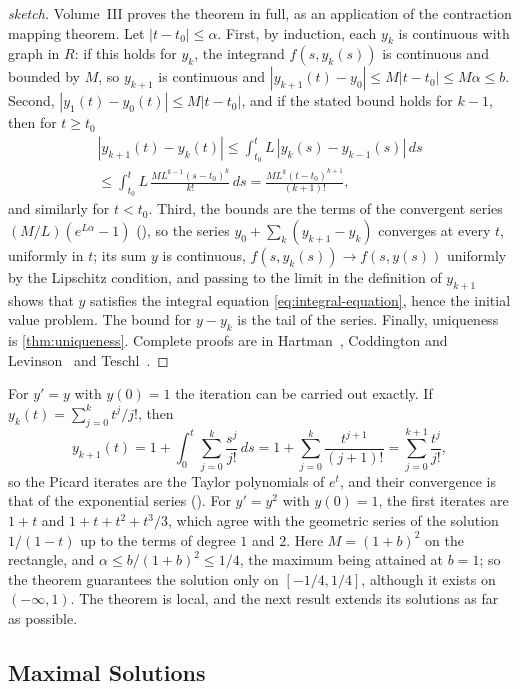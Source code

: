 \begin{proof}[sketch]
Volume~III proves the theorem in full, as an application of the contraction mapping theorem. Let $|t-t_0|\le\alpha$. First, by induction, each $y_k$ is continuous with graph in $R$: if this holds for $y_k$, the integrand $f(s,y_k(s))$ is continuous and bounded by $M$, so $y_{k+1}$ is continuous and $|y_{k+1}(t)-y_0|\le M|t-t_0|\le M\alpha\le b$. Second, $|y_1(t)-y_0(t)|\le M|t-t_0|$, and if the stated bound holds for $k-1$, then for $t\ge t_0$
\begin{multline*}
|y_{k+1}(t)-y_k(t)|\le\int_{t_0}^tL\,|y_k(s)-y_{k-1}(s)|\,ds\\\le\int_{t_0}^tL\,\frac{ML^{k-1}(s-t_0)^k}{k!}\,ds=\frac{ML^k(t-t_0)^{k+1}}{(k+1)!},
\end{multline*}
and similarly for $t<t_0$. Third, the bounds are the terms of the convergent series $(M/L)(e^{L\alpha}-1)$ (), so the series $y_0+\sum_k(y_{k+1}-y_k)$ converges at every $t$, uniformly in $t$; its sum $y$ is continuous, $f(s,y_k(s))\to f(s,y(s))$ uniformly by the Lipschitz condition, and passing to the limit in the definition of $y_{k+1}$ shows that $y$ satisfies the integral equation \eqref{eq:integral-equation}, hence the initial value problem. The bound for $y-y_k$ is the tail of the series. Finally, uniqueness is \cref{thm:uniqueness}. Complete proofs are in Hartman~\cite[Chap.~II]{hartman2002}, Coddington and Levinson~\cite[Chap.~1]{coddington1955} and Teschl~\cite[Chap.~2]{teschl2012}.
\end{proof}

For $y'=y$ with $y(0)=1$ the iteration can be carried out exactly. If $y_k(t)=\sum_{j=0}^kt^j/j!$, then
\[
y_{k+1}(t)=1+\int_0^t\sum_{j=0}^k\frac{s^j}{j!}\,ds=1+\sum_{j=0}^k\frac{t^{j+1}}{(j+1)!}=\sum_{j=0}^{k+1}\frac{t^j}{j!} ,
\]
so the Picard iterates are the Taylor polynomials of $e^t$, and their convergence is that of the exponential series (). For $y'=y^2$ with $y(0)=1$, the first iterates are $1+t$ and $1+t+t^2+t^3/3$, which agree with the geometric series of the solution $1/(1-t)$ up to the terms of degree $1$ and $2$. Here $M=(1+b)^2$ on the rectangle, and $\alpha\le b/(1+b)^2\le1/4$, the maximum being attained at $b=1$; so the theorem guarantees the solution only on $[-1/4,1/4]$, although it exists on $(-\infty,1)$. The theorem is local, and the next result extends its solutions as far as possible.

\subsection{Maximal Solutions}

